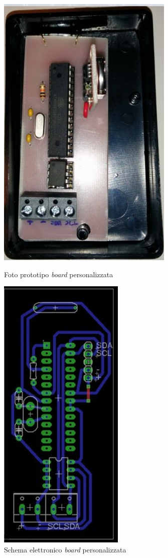 \begin{figure}[htbp]
\begin{minipage}[c]{0.5\textwidth}
\centering\setlength{\captionmargin}{0pt}
\includegraphics[width=.53\textwidth]{./capitoli/capitolo3/img/foto}
\caption{Foto prototipo \textit{board} personalizzata}
\end{minipage}
\hspace{10mm}%
\begin{minipage}[c]{0.5\textwidth}
\centering\setlength{\captionmargin}{0pt}
\includegraphics[width=.38\textwidth]{./capitoli/capitolo3/img/circuitoe}
\caption{Schema elettronico \textit{board} personalizzata}
\end{minipage}
\end{figure}

